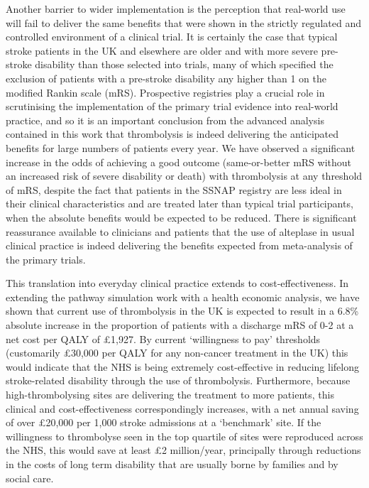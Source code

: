 Another barrier to wider implementation is the perception that real-world use will fail to deliver the same benefits that were shown in the strictly regulated and controlled environment of a clinical trial. It is certainly the case that typical stroke patients in the UK and elsewhere are older and with more severe pre-stroke disability than those selected into trials, many of which specified the exclusion of patients with a pre-stroke disability any higher than 1 on the modified Rankin scale (mRS). Prospective registries play a crucial role in scrutinising the implementation of the primary trial evidence into real-world practice, and so it is an important conclusion from the advanced analysis contained in this work that thrombolysis is indeed delivering the anticipated benefits for large numbers of patients every year. We have observed a significant increase in the odds of achieving a good outcome (same-or-better mRS without an increased risk of severe disability or death) with thrombolysis at any threshold of mRS, despite the fact that patients in the SSNAP registry are less ideal in their clinical characteristics and are treated later than typical trial participants, when the absolute benefits would be expected to be reduced. There is significant reassurance available to clinicians and patients that the use of alteplase in usual clinical practice is indeed delivering the benefits expected from meta-analysis of the primary trials.

This translation into everyday clinical practice extends to cost-effectiveness. In extending the pathway simulation work with a health economic analysis, we have shown that current use of thrombolysis in the UK is expected to result in a 6.8\% absolute increase in the proportion of patients with a discharge mRS of 0-2 at a net cost per QALY of £1,927. By current ‘willingness to pay’ thresholds (customarily £30,000 per QALY for any non-cancer treatment in the UK) this would indicate that the NHS is being extremely cost-effective in reducing lifelong stroke-related disability through the use of thrombolysis. Furthermore, because high-thrombolysing sites are delivering the treatment to more patients, this clinical and cost-effectiveness correspondingly increases, with a net annual saving of over £20,000 per 1,000 stroke admissions at a ‘benchmark’ site. If the willingness to thrombolyse seen in the top quartile of sites were reproduced across the NHS, this would save at least £2 million/year, principally through reductions in the costs of long term disability that are usually borne by families and by social care.

